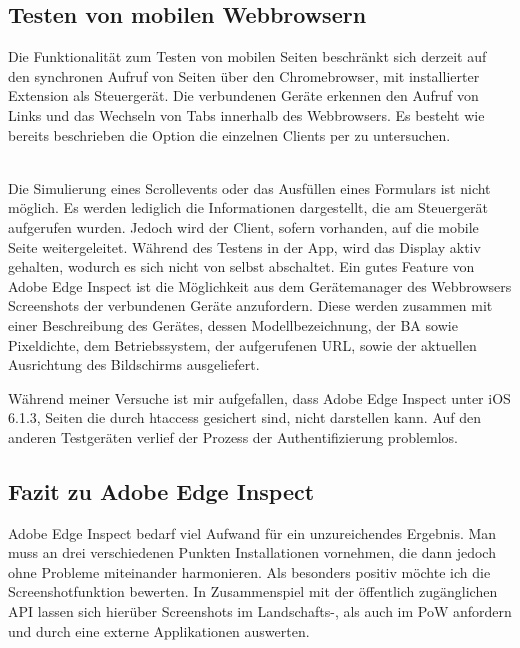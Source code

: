 		\subsection{Testen von mobilen \Gls{Webbrowser}n}
		Die Funktionalität zum Testen von mobilen Seiten beschränkt sich derzeit auf den synchronen Aufruf von Seiten über den Chromebrowser, mit installierter Extension als Steuergerät. Die verbundenen Geräte erkennen den Aufruf von Links und das Wechseln von Tabs innerhalb des \Gls{Webbrowser}s. Es besteht wie bereits beschrieben die Option die einzelnen Clients per  zu untersuchen.
		
		\\Die Simulierung eines Scrollevents oder das Ausfüllen eines Formulars ist nicht möglich. Es werden lediglich die Informationen dargestellt, die am Steuergerät aufgerufen wurden. Jedoch wird der Client, sofern vorhanden, auf die mobile Seite weitergeleitet. Während des Testens in der \Gls{App}, wird das Display aktiv gehalten, wodurch es sich nicht von selbst abschaltet. Ein gutes Feature von Adobe Edge Inspect ist die Möglichkeit aus dem Gerätemanager des \Gls{Webbrowser}s Screenshots der verbundenen Geräte anzufordern. Diese werden zusammen mit einer Beschreibung des Gerätes, dessen Modellbezeichnung, der \Gls{BA} sowie \Gls{Pixel}dichte, dem Betriebssystem, der aufgerufenen URL, sowie der aktuellen Ausrichtung des Bildschirms ausgeliefert.
		
		Während meiner Versuche ist mir aufgefallen, dass Adobe Edge Inspect unter iOS 6.1.3, Seiten die durch \gls{htaccess} 				gesichert sind, nicht darstellen kann. Auf den anderen Testgeräten verlief der Prozess der Authentifizierung problemlos. 
		
		\pagebreak
		\subsection{Fazit zu Adobe Edge Inspect}
		Adobe Edge Inspect bedarf viel Aufwand für ein unzureichendes Ergebnis. Man muss an drei verschiedenen Punkten Installationen vornehmen, die dann jedoch \mbox{ohne} Probleme miteinander harmonieren. Als besonders positiv möchte ich die Screenshotfunktion bewerten. In Zusammenspiel mit der öffentlich zugänglichen API lassen sich hierüber Screenshots im Landschafts-, als auch im \Gls{PoW} anfordern und durch eine externe \Gls{App}likationen auswerten. 
		

